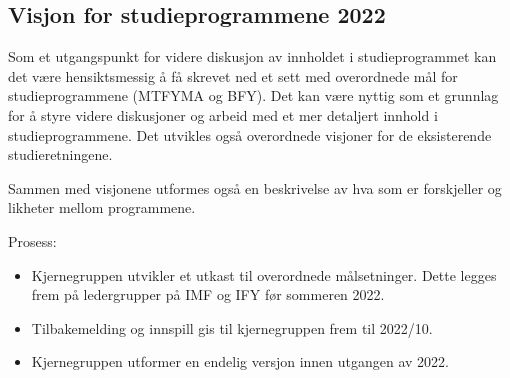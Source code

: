 \subsection{Visjon for studieprogrammene 2022}

Som et utgangspunkt for videre diskusjon av innholdet i studieprogrammet kan det være hensiktsmessig å få skrevet ned et sett med overordnede mål for studieprogrammene (MTFYMA og BFY). Det kan være nyttig som et grunnlag for å styre videre diskusjoner og arbeid med et mer detaljert innhold i studieprogrammene. Det utvikles også overordnede visjoner for de eksisterende studieretningene.

Sammen med visjonene utformes også en beskrivelse av hva som er forskjeller og likheter mellom programmene.

Prosess:
\begin{itemize}
	\item Kjernegruppen utvikler et utkast til overordnede målsetninger. Dette legges frem på ledergrupper på IMF og IFY før sommeren 2022. 
	\item Tilbakemelding og innspill gis til kjernegruppen frem til 2022/10. 
	\item Kjernegruppen utformer en endelig versjon innen utgangen av 2022.
\end{itemize}


